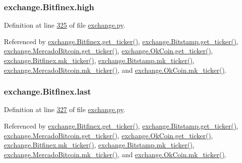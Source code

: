 \subsubsection[{\texorpdfstring{high}{high}}]{\setlength{\rightskip}{0pt plus 5cm}exchange.\+Bitfinex.\+high}\hypertarget{classexchange_1_1_bitfinex_a1380a7a7a3438e47785f10f68b0d61b9}{}\label{classexchange_1_1_bitfinex_a1380a7a7a3438e47785f10f68b0d61b9}


Definition at line \hyperlink{exchange_8py_source_l00325}{325} of file \hyperlink{exchange_8py_source}{exchange.\+py}.



Referenced by \hyperlink{exchange_8py_source_l00332}{exchange.\+Bitfinex.\+get\+\_\+ticker()}, \hyperlink{exchange_8py_source_l00401}{exchange.\+Bitstamp.\+get\+\_\+ticker()}, \hyperlink{exchange_8py_source_l00535}{exchange.\+Mercado\+Bitcoin.\+get\+\_\+ticker()}, \hyperlink{exchange_8py_source_l00600}{exchange.\+Ok\+Coin.\+get\+\_\+ticker()}, \hyperlink{exchange_8py_source_l00346}{exchange.\+Bitfinex.\+mk\+\_\+ticker()}, \hyperlink{exchange_8py_source_l00415}{exchange.\+Bitstamp.\+mk\+\_\+ticker()}, \hyperlink{exchange_8py_source_l00549}{exchange.\+Mercado\+Bitcoin.\+mk\+\_\+ticker()}, and \hyperlink{exchange_8py_source_l00614}{exchange.\+Ok\+Coin.\+mk\+\_\+ticker()}.

\subsubsection[{\texorpdfstring{last}{last}}]{\setlength{\rightskip}{0pt plus 5cm}exchange.\+Bitfinex.\+last}\hypertarget{classexchange_1_1_bitfinex_a56e491a27f4b3215b66e13da7796c078}{}\label{classexchange_1_1_bitfinex_a56e491a27f4b3215b66e13da7796c078}


Definition at line \hyperlink{exchange_8py_source_l00327}{327} of file \hyperlink{exchange_8py_source}{exchange.\+py}.



Referenced by \hyperlink{exchange_8py_source_l00332}{exchange.\+Bitfinex.\+get\+\_\+ticker()}, \hyperlink{exchange_8py_source_l00401}{exchange.\+Bitstamp.\+get\+\_\+ticker()}, \hyperlink{exchange_8py_source_l00535}{exchange.\+Mercado\+Bitcoin.\+get\+\_\+ticker()}, \hyperlink{exchange_8py_source_l00600}{exchange.\+Ok\+Coin.\+get\+\_\+ticker()}, \hyperlink{exchange_8py_source_l00346}{exchange.\+Bitfinex.\+mk\+\_\+ticker()}, \hyperlink{exchange_8py_source_l00415}{exchange.\+Bitstamp.\+mk\+\_\+ticker()}, \hyperlink{exchange_8py_source_l00549}{exchange.\+Mercado\+Bitcoin.\+mk\+\_\+ticker()}, and \hyperlink{exchange_8py_source_l00614}{exchange.\+Ok\+Coin.\+mk\+\_\+ticker()}.

